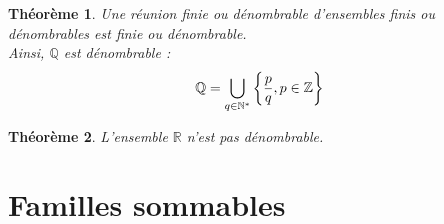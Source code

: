 \documentclass[11pt,a4paper]{report}
\newtheorem{theorem}{Théorème}[chapter]
\theoremstyle{definition}
\begin{document}
\begin{theorem}
     Une réunion finie ou dénombrable d'ensembles finis ou  dénombrables est finie ou  dénombrable.\\[5mm]
     Ainsi, $\mathbb{Q}$ est dénombrable : \[\mathbb{Q} = \bigcup_{q\in\mathbb{N}^*}\left\lbrace \vphantom{\mathbb{N}} \frac{p}{q}, p \in \mathbb{Z} \right\rbrace\]
\end{theorem}
\begin{theorem}
     L'ensemble \ensuremath{\mathbb{R}} n'est pas dénombrable.
\end{theorem}

\section{Familles sommables} %
\label{sec:familles_sommables}
\end{document}
